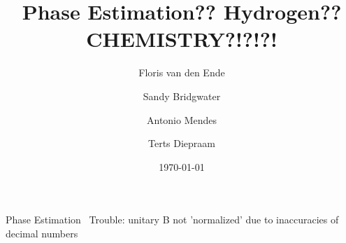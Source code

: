 \documentclass{article}
\title{Phase Estimation?? Hydrogen?? CHEMISTRY?!?!?!}
\author{Floris van den Ende\and Sandy Bridgwater\and Antonio Mendes\and Terts Diepraam}
\date{\today}
\begin{document}
\maketitle

Phase Estimation~\cite{Qiskit-Textbook}
Trouble: unitary B not 'normalized' due to inaccuracies of decimal numbers

\printbibliography
\end{document}
